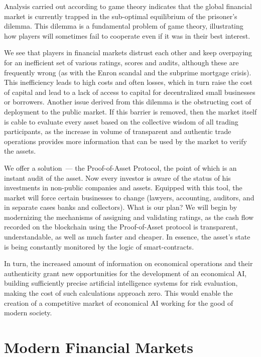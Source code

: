 \documentclass{article}
\begin{document}
\begin{multicols}{2}
Analysis carried out according to game theory indicates that the global financial market is currently trapped in the sub-optimal equilibrium of the prisoner’s dilemma. This dilemma is a fundamental problem of game theory, illustrating how players will sometimes fail to cooperate even if it was in their best interest.

We see that players in financial markets distrust each other and keep overpaying for an inefficient set of various ratings, scores and audits, although these are frequently wrong (as with the Enron scandal and the subprime mortgage crisis). This inefficiency leads to high costs and often losses, which in turn raise the cost of capital and lead to a lack of access to capital for decentralized small businesses or borrowers. Another issue derived from this dilemma is the obstructing cost of deployment to the public market. If this barrier is removed, then the market itself is cable to evaluate every asset based on the collective wisdom of all trading participants, as the increase in volume of transparent and authentic trade operations provides more information that can be used by the market to verify the assets.

We offer a solution~--- the Proof-of-Asset Protocol, the point of which is an instant audit of the asset. Now every investor is aware of the status of his investments in non-public companies and assets. Equipped with this tool, the market will force certain businesses to change (lawyers, accounting, auditors, and in separate cases banks and collectors). What is our plan? We will begin by modernizing the mechanisms of assigning and validating ratings, as the cash flow recorded on the blockchain using the Proof-of-Asset protocol is transparent, understandable, as well as much faster and cheaper. In essence, the asset’s state is being constantly monitored by the logic of smart-contracts.

In turn, the increased amount of information on economical operations and their authenticity grant new opportunities for the development of an economical AI, building sufficiently precise artificial intelligence systems for risk evaluation, making the cost of such calculations approach zero. This would enable the creation of a competitive market of economical AI working for the good of modern society. 

\section{Modern Financial Markets}


\end{multicols}
\end{document}
